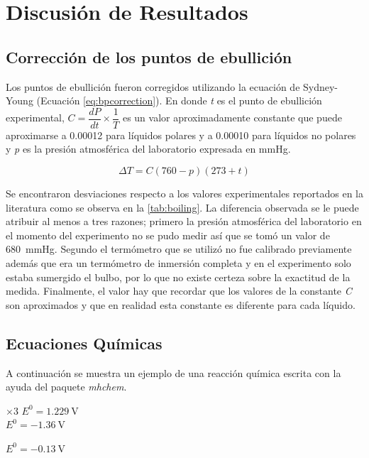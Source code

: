 \documentclass[12pt,letterpaper]{article}
\begin{document}
\section{Discusión de Resultados\label{sec:discusion}}

\subsection{Corrección de los puntos de ebullición}

Los puntos de ebullición fueron corregidos utilizando la ecuación de Sydney-Young\autocite{young:1902} (Ecuación \ref{eq:bpcorrection}). En donde \textit{t} es el punto de ebullición experimental, $C = \dfrac{dP}{dt} \times \dfrac{1}{T}$ es un valor aproximadamente constante que puede aproximarse a \num{0.00012} para líquidos polares y a \num{0.00010} para líquidos no polares y \textit{p} es la presión atmosférica del laboratorio expresada en mmHg.

\begin{equation}
\label{eq:bpcorrection}
\Delta T = C(760 - p)(273 + t)
\end{equation}

Se encontraron desviaciones respecto a los valores experimentales reportados en la literatura como se observa en la \ref{tab:boiling}. La diferencia observada se le puede atribuir al menos a tres razones; primero la presión atmosférica del laboratorio en el momento del experimento no se pudo medir así que se tomó un valor de \SI{680}{\mmHg}. Segundo el termómetro que se utilizó no fue calibrado previamente además que era un termómetro de inmersión completa y en el experimento solo estaba sumergido el bulbo, por lo que no existe certeza sobre la exactitud de la medida. Finalmente, el valor hay que recordar que los valores de la constante \textit{C} son aproximados y que en realidad esta constante es diferente para cada líquido.

\subsection{Ecuaciones Químicas}

A continuación se muestra un ejemplo de una reacción química escrita con la ayuda del paquete \textit{mhchem}.

\begin{center}
 \hspace{19mm} $\times 3$ \hspace{20mm} $E^0 = \SI{1.229}{\volt}$\\
\vspace{3mm}
 \hspace{24mm} $E^0 = \SI{-1.36}{\volt}$\\
\underline{\hspace{145mm}}

 \hspace{15mm} $E^0 = \SI{-0.13}{\volt}$\\
\end{center}
\end{document}
